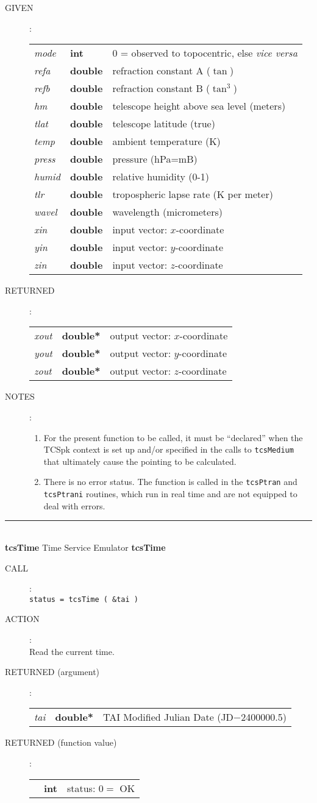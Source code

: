 \documentclass[12pt,fleqn,twoside]{article}
\renewcommand{\_}{{\tt\char'137}}     %
\newcommand{\routine}[2]
{
  \newpage
  \rule{\textwidth}{0.3mm}\\ \nopagebreak
  {\Large {\bf #1} \hfill #2 \hfill {\bf #1}}
  \vspace{-1ex}
}
\newcommand{\call}[1]
{
  \goodbreak
  \begin{description}
    \item[CALL]: \\[0.5ex] \nopagebreak
        {\tt #1}
  \end{description}
  \vspace{-3ex}
}
\newcommand{\action}[1]
{
  \goodbreak
  \begin{description}
    \item[ACTION]: \\[0.5ex] \nopagebreak
        #1
  \end{description}
  \vspace{-3ex}
}
\newcommand{\args}[2]
{
  \goodbreak
  \begin{description}
  \item[#1]: \\[1.5ex] \nopagebreak
    \hspace*{-0.9em}
    \begin{tabular}{p{4.5em}p{5.8em}p{23.5em}}
      #2
    \end{tabular}
  \end{description}
  \vspace{-3ex}
}
\newcommand{\spec}[3]
{
  {\em {#1}} & {\bf \mbox{#2}} & {#3}
}
\newcommand{\notes}[1]
{
  \goodbreak
  \begin{description}
    \item[NOTES]: \nopagebreak
        #1
  \end{description}
  \vspace{-3ex}
}
\begin{document}
\args{GIVEN}
{
\spec{mode}{int}{0 = observed to topocentric, else {\it vice versa}} \\
\spec{refa}{double}{refraction constant A ($\tan$)} \\
\spec{refb}{double}{refraction constant B ($\tan^3$)} \\
\spec{hm}{double}{telescope height above sea level (meters)} \\
\spec{tlat}{double}{telescope latitude (true)} \\
\spec{temp}{double}{ambient temperature (K)} \\
\spec{press}{double}{pressure (hPa=mB)} \\
\spec{humid}{double}{relative humidity (0-1)} \\
\spec{tlr}{double}{tropospheric lapse rate (K per meter)} \\
\spec{wavel}{double}{wavelength (micrometers)} \\
\spec{xin}{double}{input vector: $x$-coordinate} \\
\spec{yin}{double}{input vector: $y$-coordinate} \\
\spec{zin}{double}{input vector: $z$-coordinate}
}
\args{RETURNED}
{
\spec{xout}{double*}{output vector: $x$-coordinate} \\
\spec{yout}{double*}{output vector: $y$-coordinate} \\
\spec{zout}{double*}{output vector: $z$-coordinate}
}
\notes{
\begin{enumerate}
\item For the present function to be called, it must be ``declared''
      when the TCSpk context is set up and/or specified in the calls
      to {\tt tcsMedium} that ultimately cause the pointing to be
      calculated.
\item There is no error status.  The function is called in the
      {\tt tcsPtran} and {\tt tcsPtrani} routines, which run in
      real time and are not equipped to deal with errors.
\end{enumerate}
}
\routine{tcsTime}{Time Service Emulator}
\label{tcsTime}
\call{status = tcsTime ( \&tai ) }
\action{Read the current time.}
\args{RETURNED \rm (argument)}
{
\spec{tai}{double*}{TAI Modified Julian Date (JD$-$2400000.5)}
}
\args{RETURNED \rm (function value)}
{
\spec{}{int}{status: $0 =$ OK}
}
\end{document}
